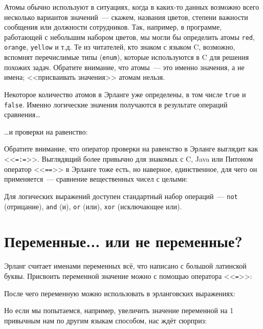 \documentclass[
  paper=a4,
  fontsize=14pt,
  openany,
  appendixprefix=true
]{scrbook}
\begin{document}
Атомы обычно используют в ситуациях, когда в каких-то данных возможно всего несколько вариантов значений~--- скажем, названия цветов, степени важности сообщения или должности сотрудников. Так, например, в программе, работающей с небольшим набором цветов, мы могли бы определить атомы \lstinline{red}, \lstinline{orange}, \lstinline{yellow} и т.д. Те из читателей, кто знаком с языком C, возможно, вспомнят перечислимые типы (\lstinline{enum}), которые используются в C для решения похожих задач.
Обратите внимание, что атомы~--- это именно значения, а не имена; <<присваивать значения>> атомам нельзя.

Некоторое количество атомов в Эрланге уже определены, в том числе \lstinline{true} и \lstinline{false}. Именно логические значения получаются в результате операций сравнения\ldots{}

\ldots{}и проверки на равенство:

Обратите внимание, что оператор проверки на равенство в Эрланге выглядит как <<\lstinline{=:=}>>. Выглядящий более привычно для знакомых с C, Java или Питоном оператор <<\lstinline{==}>> в Эрланге тоже есть, но наверное, единственное, для чего он применяется~--- сравнение вещественных чисел с целыми:

Для логических выражений доступен стандартный набор операций~--- \lstinline{not} (отрицание), \lstinline{and} (и), \lstinline{or} (или), \lstinline{xor} (исключающее или).

\section{Переменные... или не переменные?}

Эрланг считает именами переменных всё, что написано с большой латинской буквы. Присвоить переменной значение можно с помощью оператора <<\lstinline{=}>>:

После чего переменную можно использовать в эрланговских выражениях:

Но если мы попытаемся, например, увеличить значение переменной на 1 привычным нам по другим языкам способом, нас ждёт сюрприз:
\end{document}
